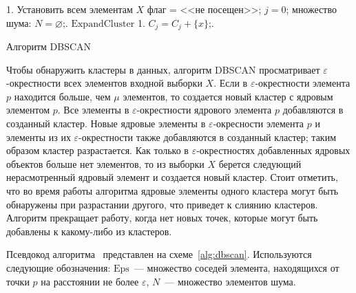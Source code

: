 \begin{algorithm}[t!]
    \DontPrintSemicolon
    1. Установить всем элементам \( X \) флаг = <<не посещен>>; \( j = 0 \); множество шума: \( N = \varnothing \);. 
    \BlankLine
    \( \mathrm{ExpandCluster} \)\;
    1. \( C_j = C_j + \{x\} \);. 
    \caption{Алгоритм DBSCAN}
    \label{alg:dbscan}
\end{algorithm}

Чтобы обнаружить кластеры в данных, алгоритм DBSCAN просматривает \( \varepsilon \)-окрестности всех элементов входной выборки \( X \). Если в \( \varepsilon \)-окрестности элемента \( p \) находится больше, чем \( \mu \) элементов, то создается новый кластер с ядровым элементом \( p \). Все элементы в \( \varepsilon \)-окрестности ядрового элемента \( p \) добавляются в созданный кластер. Новые ядровые элементы в \( \varepsilon \)-окресности элемента \( p \) и элементы из их \( \varepsilon \)-окрестности также добавляются в созданный кластер; таким образом кластер разрастается. Как только в \( \varepsilon \)-окрестностях добавленных ядровых объектов больше нет элементов, то из выборки \( X \) берется следующий нерасмотренный ядровый элемент и создается новый кластер. Стоит отметить, что во время работы алгоритма ядровые элементы одного кластера могут быть обнаружены при разрастании другого, что приведет к слиянию кластеров. Алгоритм прекращает работу, когда нет новых точек, которые могут быть добавлены к какому-либо из кластеров.

Псевдокод алгоритма~\cite[с. 199]{dbscan-pos} представлен на схеме~\ref{alg:dbscan}. Используются следующие обозначения: \( \mathrm{Eps} \)~--- множество соседей элемента, находящихся от точки \( p \) на расстоянии не более \( \varepsilon \), \( N \)~--- множество элементов шума.

